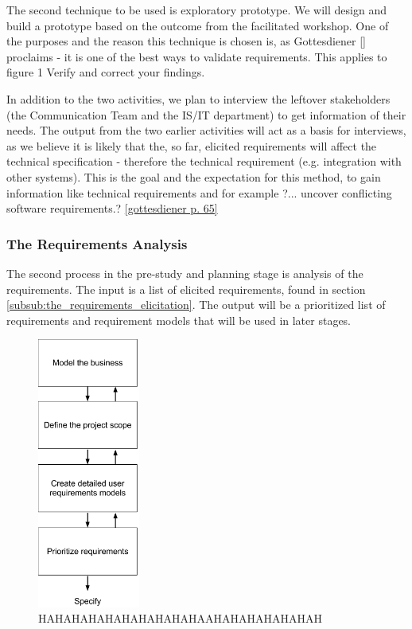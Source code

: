\documentclass[a4paper]{article}
\begin{document}
The second technique to be used is exploratory prototype. We will design and build a prototype based on the outcome from the facilitated workshop. One of the purposes and the reason this technique is chosen is, as Gottesdiener \ref{} proclaims - it is one of the best ways to validate requirements. This applies to figure 1 Verify and correct your findings. 

In addition to the two activities, we plan to interview the leftover stakeholders (the Communication Team and the IS/IT department) to get information of their needs. The output from the two earlier activities will act as a basis for interviews, as we believe it is likely that the, so far, elicited requirements will affect the technical specification - therefore the technical requirement (e.g. integration with other systems). This is the goal and the expectation for this method, to gain information like technical requirements and for example ?... uncover conflicting software requirements.? \ref{gottesdiener p. 65}

\subsubsection{The Requirements Analysis}
\label{subsub:the_requirements_analysis}
The second process in the pre-study and planning stage is analysis of the requirements. The input is a list of elicited requirements, found in section \ref{subsub:the_requirements_elicitation}. The output will be a prioritized list of requirements and requirement models that will be used in later stages.

\begin{figure}[h!]
	\centering
		\includegraphics[width=0.3\textwidth]{images/analysis_model.png}
	\caption{HAHAHAHAHAHAHAHAHAHAAHAHAHAHAHAHAH}
	\label{figure:analysis}
\end{figure}
\end{document}
